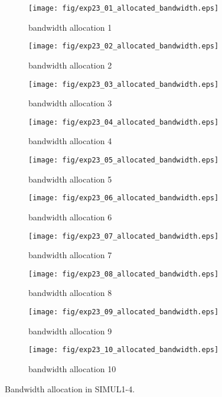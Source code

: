 	\begin{figure}
		\begin{center}
			\begin{subfigure}[b]{0.32\textwidth}
				\texttt{[image: fig/exp23\_01\_allocated\_bandwidth.eps]}
				\caption{bandwidth allocation 1}
				\label{figure:simul1_4_b_a}
			\end{subfigure}
			\begin{subfigure}[b]{0.32\textwidth}
				\texttt{[image: fig/exp23\_02\_allocated\_bandwidth.eps]}
				\caption{bandwidth allocation 2}
				\label{figure:simul1_4_b_b}
			\end{subfigure}
			\begin{subfigure}[b]{0.32\textwidth}
				\texttt{[image: fig/exp23\_03\_allocated\_bandwidth.eps]}
				\caption{bandwidth allocation 3}
				\label{figure:simul1_4_b_c}
			\end{subfigure}
			\begin{subfigure}[b]{0.32\textwidth}
				\texttt{[image: fig/exp23\_04\_allocated\_bandwidth.eps]}
				\caption{bandwidth allocation 4}
				\label{figure:simul1_4_b_d}
			\end{subfigure}
			\begin{subfigure}[b]{0.32\textwidth}
				\texttt{[image: fig/exp23\_05\_allocated\_bandwidth.eps]}
				\caption{bandwidth allocation 5}
				\label{figure:simul1_4_b_e}
			\end{subfigure}
			\begin{subfigure}[b]{0.32\textwidth}
				\texttt{[image: fig/exp23\_06\_allocated\_bandwidth.eps]}
				\caption{bandwidth allocation 6}
				\label{figure:simul1_4_b_f}
			\end{subfigure}
			\begin{subfigure}[b]{0.32\textwidth}
				\texttt{[image: fig/exp23\_07\_allocated\_bandwidth.eps]}
				\caption{bandwidth allocation 7}
				\label{figure:simul1_4_b_g}
			\end{subfigure}
			\begin{subfigure}[b]{0.32\textwidth}
				\texttt{[image: fig/exp23\_08\_allocated\_bandwidth.eps]}
				\caption{bandwidth allocation 8}
				\label{figure:simul1_4_b_h}
			\end{subfigure}
			\begin{subfigure}[b]{0.32\textwidth}
				\texttt{[image: fig/exp23\_09\_allocated\_bandwidth.eps]}
				\caption{bandwidth allocation 9}
				\label{figure:simul1_4_b_i}
			\end{subfigure}
			\begin{subfigure}[b]{0.32\textwidth}
				\texttt{[image: fig/exp23\_10\_allocated\_bandwidth.eps]}
				\caption{bandwidth allocation 10}
				\label{figure:simul1_4_b_j}
			\end{subfigure}
			\caption{Bandwidth allocation in SIMUL1-4.}
			\label{figure:simul1_4_ba}
		\end{center}
	\end{figure}
	

